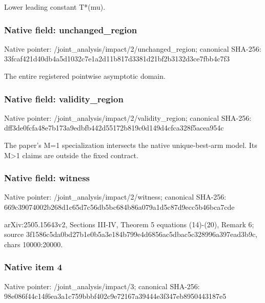 \documentclass[10pt,a4paper]{article}
\begin{document}
\begingroup\raggedright\sloppy Lower leading constant T*(mu).\par\endgroup

\subsubsection{Native field: unchanged\_\allowbreak{}region}
Native pointer: /joint\_\allowbreak{}analysis/impact/2/unchanged\_\allowbreak{}region; canonical SHA-256: 33fcaf421d40db4a5d1032c7e1a2d11b817d3381d21bf2b3132d3ce7fbb4c7f3

\begingroup\raggedright\sloppy The entire registered pointwise asymptotic domain.\par\endgroup

\subsubsection{Native field: validity\_\allowbreak{}region}
Native pointer: /joint\_\allowbreak{}analysis/impact/2/validity\_\allowbreak{}region; canonical SHA-256: dff3de0fcfa48e7b173a9edbfb442d55172b819c0d149d4cfca328f5acea954c

\begingroup\raggedright\sloppy The paper's M=\allowbreak{}1 specialization intersects the native unique-best-arm model. Its M>1 claims are outside the fixed contract.\par\endgroup

\subsubsection{Native field: witness}
Native pointer: /joint\_\allowbreak{}analysis/impact/2/witness; canonical SHA-256: 669c39074002b268d1c65d7c56db5bc684b86a079a1d5c87d9ecc5b46bca7cde

\begingroup\raggedright\sloppy arXiv:\allowbreak{}2505.15643v2,\allowbreak{} Sections III-IV,\allowbreak{} Theorem 5 equations (14)-(20),\allowbreak{} Remark 6;\allowbreak{} source 3f1586c5da0bd27b1e0b5a3e184b799e4d6856ac5dbac5c328996a397ead3b9c,\allowbreak{} chars 10000:\allowbreak{}20000.\par\endgroup

\subsubsection{Native item 4}
Native pointer: /joint\_\allowbreak{}analysis/impact/3; canonical SHA-256: 98e086f44c14f6ea3a1c759bbbf402c9e72167a39444e3f347eb8950443187e5
\end{document}

